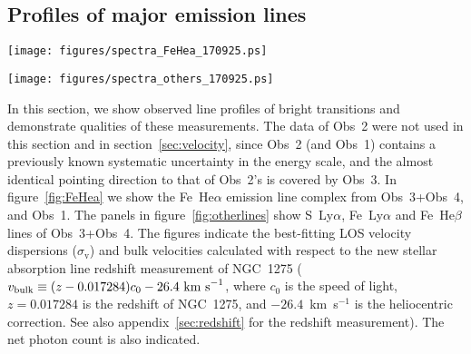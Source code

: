 \subsection{Profiles of major emission lines}
\label{sec:spectra}

\begin{figure*}
 \begin{center}
  \texttt{[image: figures/spectra\_FeHea\_170925.ps]}
 \end{center}
 \caption{Fe~He$\alpha$ lines of the full-FOV data of Obs~3+Obs~4 (left) and Obs~1 (right). The LOS velocity dispersion ($\sigma_\mathrm{v}$, {\it w}-line excluded. See also table~\ref{tab:obs34_width}), the bulk velocity calculated with respect to the redshift of NGC~1275 ($v_\mathrm{bulk}$) and the total number of photons in the displayed energy band are shown in each figure. The red curves are the best-fitting models, and the dotted curves are the spectral constituents, i.e., modified APEC or Gaussian. See main text for details. The energy bin size is 1~eV or wider for lower count bins. The resonance line ({\it w}), the intercombination lines ({\it x} and {\it y}), and the forbidden line ({\it z}) are denoted. The letters are as given in \citet{gabriel72}.}
 \label{fig:FeHea}
\end{figure*}

\begin{figure*}
 \begin{center}
  \texttt{[image: figures/spectra\_others\_170925.ps]} 
 \end{center}
 \caption{Same as figure~\ref{fig:FeHea}, but for S~Ly$\alpha$ (upper left), Fe~Ly$\alpha$ (upper right) and Fe~He$\beta$ (lower left) of Obs~3+4. Representative line are denoted in the figures.}
 \label{fig:otherlines}
\end{figure*}

In this section, we show observed line profiles of bright transitions
and demonstrate qualities of these measurements. The data of Obs~2 were not used
in this section and in section~\ref{sec:velocity}, since Obs~2 (and Obs~1)
contains a previously known systematic uncertainty in the energy
scale, and the almost identical pointing direction to that of Obs~2's is covered by Obs~3.
In figure~\ref{fig:FeHea} we show the Fe~He$\alpha$ emission line
complex from Obs~3+Obs~4, and Obs~1.  The panels in
figure~\ref{fig:otherlines} show S~Ly$\alpha$, Fe~Ly$\alpha$ and
Fe~He$\beta$ lines of Obs~3+Obs~4. The figures indicate the best-fitting
LOS velocity dispersions ($\sigma_\mathrm{v}$) and bulk velocities
calculated with respect to the new stellar absorption line redshift
measurement of NGC~1275 ($v_{\rm bulk}\equiv(z-0.017284)c_0-26.4~{\rm
km~s}^{-1}$, where $c_0$ is the speed of light, $z=0.017284$ is the
redshift of NGC~1275, and $-26.4$~km~s$^{-1}$ is the heliocentric
correction. See also appendix~\ref{sec:redshift} for the redshift
measurement). The net photon count is also indicated.

